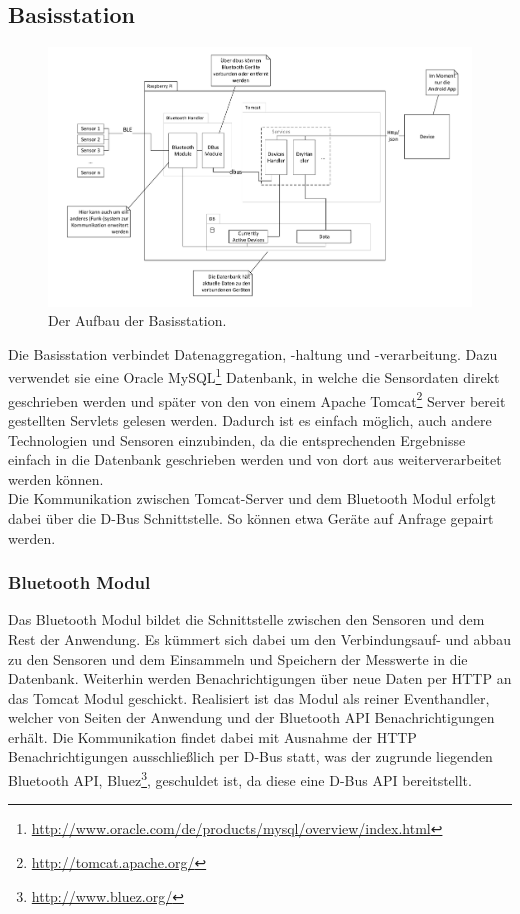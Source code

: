 \subsection{Basisstation}
\begin{figure}[htb] 
	\centerline{\includegraphics[scale=.4]{Architektur/BaseStation_v2.pdf} }
	\caption{Der Aufbau der Basisstation.}
\end{figure}

Die Basisstation verbindet Datenaggregation, -haltung und -verarbeitung. Dazu verwendet sie eine Oracle MySQL\footnote{\url{http://www.oracle.com/de/products/mysql/overview/index.html}} Datenbank, in welche die Sensordaten direkt geschrieben werden und später von den von einem Apache Tomcat\footnote{\url{http://tomcat.apache.org/}} Server bereit gestellten Servlets gelesen werden. Dadurch ist es einfach möglich, auch andere Technologien und Sensoren einzubinden, da die entsprechenden Ergebnisse einfach in die Datenbank geschrieben werden und von dort aus weiterverarbeitet werden können.\\
Die Kommunikation zwischen Tomcat-Server und dem Bluetooth Modul erfolgt dabei über die D-Bus Schnittstelle. So können etwa Geräte auf Anfrage gepairt werden.

\subsubsection{Bluetooth Modul}
Das Bluetooth Modul bildet die Schnittstelle zwischen den Sensoren und dem Rest der Anwendung. Es kümmert sich dabei um den Verbindungsauf- und abbau zu den Sensoren und dem Einsammeln und Speichern der Messwerte in die Datenbank. Weiterhin werden Benachrichtigungen über neue Daten per HTTP an das Tomcat Modul geschickt. Realisiert ist das Modul als reiner Eventhandler, welcher von Seiten der Anwendung und der Bluetooth API Benachrichtigungen erhält. Die Kommunikation findet dabei mit Ausnahme der HTTP Benachrichtigungen ausschließlich per D-Bus statt, was der zugrunde liegenden Bluetooth API, Bluez\footnote{\url{http://www.bluez.org/}}, geschuldet ist, da diese eine D-Bus API bereitstellt.

